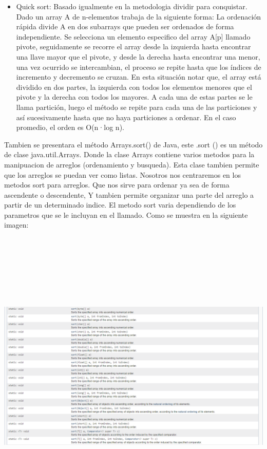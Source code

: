 \documentclass[12pt,letterpaper]{article}
\begin{document}
\begin{itemize}
\item Quick sort: Basado igualmente en la metodologia dividir para conquistar. Dado un array A de n-elementos trabaja de la siguiente forma: 
La ordenación rápida divide A en dos subarrays que pueden ser ordenados de forma independiente.
Se selecciona un elemento especifico del array A[p] llamado pivote, seguidamente se recorre el
array desde la izquierda hasta encontrar una llave mayor que el pivote, y desde la derecha hasta
encontrar una menor, una vez ocurrido se intercambian, el proceso se repite hasta que los índices de
incremento y decremento se cruzan. En esta situación notar que, el array está dividido en dos partes,
la izquierda con todos los elementos menores que el pivote y la derecha con todos los mayores. A
cada una de estas partes se le llama partición,  luego el método se repite para cada una de las
particiones y así sucesivamente hasta que no haya particiones a ordenar.
En el caso promedio, el orden es O(n·log n).
\end{itemize}
\vskip 0.4cm
Tambien se presentara el método Arrays.sort() de Java, este .sort () es un método de clase java.util.Arrays.
Donde la clase Arrays contiene varios metodos para la manipuacion de arreglos (ordenamiento y busqueda). Esta clase tambien permite que los arreglos se puedan ver como listas. Nosotros nos centraremos en los metodos sort para arreglos. Que nos sirve para ordenar ya sea de forma ascendente o descendente, Y tambien permite organizar una parte del arreglo a partir de un determinado indice.
\vskip 0.4cm
El metodo sort varia dependiendo de los parametros que se le incluyan en el llamado.
Como se muestra en la siguiente imagen:
\vskip 0.4cm
\includegraphics[width=16cm,height=15cm]{Imagen2} 
\end{document}
